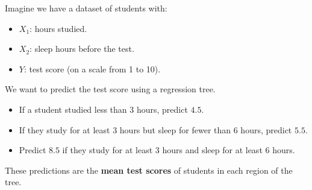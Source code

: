 \begin{examplebox}
    Imagine we have a dataset of students with:
    \begin{itemize}
        \item $X_1$: hours studied.
        \item $X_2$: sleep hours before the test.
        \item $Y$: test score (on a scale from 1 to 10).
    \end{itemize}
    We want to predict the test score using a regression tree.
    \begin{center}
    \end{center}
    \begin{itemize}
        \item If a student studied less than 3 hours, predict $4.5$.
        \item If they study for at least 3 hours but sleep for fewer than 6 hours, predict $5.5$.
        \item Predict $8.5$ if they study for at least 3 hours and sleep for at least 6 hours.
    \end{itemize}
    These predictions are the \textbf{mean test scores} of students in each region of the tree.
\end{examplebox}

